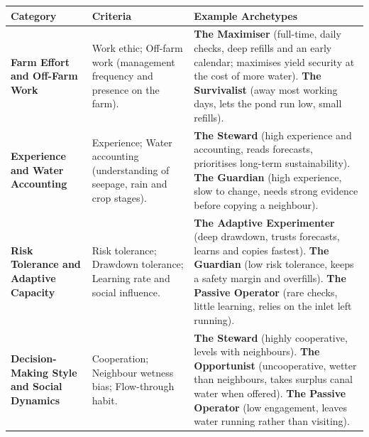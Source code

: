 \documentclass{article}
\begin{document}
\begin{changed}
\centering
\small
\begin{tabular}{|p{3.5cm}|p{4.6cm}|p{8.2cm}|}
\hline
\rowcolor[HTML]{F8F319}
\textbf{Category} & \textbf{Criteria} & \textbf{Example Archetypes} \\ \hline
\textbf{Farm Effort and Off-Farm Work} & Work ethic; Off-farm work (management frequency and presence on the farm). &
\textbf{The Maximiser} (full-time, daily checks, deep refills and an early calendar; maximises yield security at the cost of more water).\newline
\textbf{The Survivalist} (away most working days, lets the pond run low, small refills). \\ \hline
\textbf{Experience and Water Accounting} & Experience; Water accounting (understanding of seepage, rain and crop stages). &
\textbf{The Steward} (high experience and accounting, reads forecasts, prioritises long-term sustainability).\newline
\textbf{The Guardian} (high experience, slow to change, needs strong evidence before copying a neighbour). \\ \hline
\textbf{Risk Tolerance and Adaptive Capacity} & Risk tolerance; Drawdown tolerance; Learning rate and social influence. &
\textbf{The Adaptive Experimenter} (deep drawdown, trusts forecasts, learns and copies fastest).\newline
\textbf{The Guardian} (low risk tolerance, keeps a safety margin and overfills).\newline
\textbf{The Passive Operator} (rare checks, little learning, relies on the inlet left running). \\ \hline
\textbf{Decision-Making Style and Social Dynamics} & Cooperation; Neighbour wetness bias; Flow-through habit. &
\textbf{The Steward} (highly cooperative, levels with neighbours).\newline
\textbf{The Opportunist} (uncooperative, wetter than neighbours, takes surplus canal water when offered).\newline
\textbf{The Passive Operator} (low engagement, leaves water running rather than visiting). \\ \hline
\end{tabular}
\label{tab:farmer_archetypes_matrix}
\end{changed}
\end{document}
